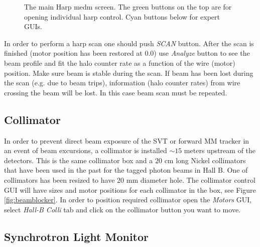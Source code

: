 \documentclass[12pt]{article}
\begin{document}
\begin{figure}[tbhp]
{\centering {} \par}
\caption{The main Harp medm screen. The green buttons on the top are for opening individual harp control. Cyan buttons below for expert GUIs.}
\label{harpmain}
\end{figure}

In order to perform a harp scan one should push {\it SCAN} button. After the scan is finished (motor position has been restored at $0.0$) use {\it Analyze} button to see the beam profile and fit the halo counter rate as a function of the wire (motor) position. Make sure beam is stable during the scan. If beam has been lost during the scan (e.g. due to beam trips), information (halo counter rates) from wire crossing the beam will be lost. In this case beam scan must be repeated.  


\subsection{Collimator \label{sec:colim}}
\indent

In order to prevent direct beam exposure of the SVT or forward MM tracker in an event of beam excursions, a collimator is installed $\sim 15$ meters upstream of the detectors. This is the same collimator box and a $20$ cm long Nickel collimators that have been used in the past for the tagged photon beams in Hall B. One of collimators has been resized to have $20$ mm diameter hole. The collimator control GUI will have sizes and motor positions for each collimator in the box, see Figure \ref{fig:beamblocker}. In order to position required collimator open the {\it Motors} GUI, select {\it Hall-B Colli} tab and click on the collimator button you want to move.   

\subsection{Synchrotron Light Monitor \label{sec:slm}}
\indent
\end{document}

